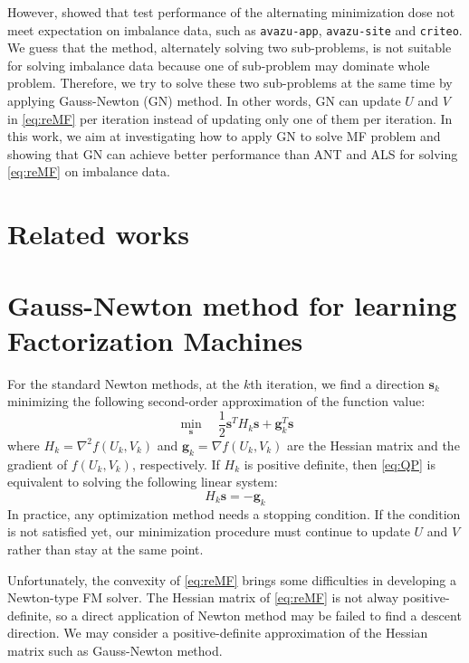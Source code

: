 \documentclass[11pt,twoside]{article}
\newcommand{\bsym}[1]{\ensuremath{\boldsymbol{#1}}}
\newcommand{\bs}{\ensuremath{\bsym{s}}}
\newcommand{\bg}{\ensuremath{\bsym{g}}}
\begin{document}
However, \citet{WSC18a} showed that test performance of the alternating minimization dose not meet expectation on imbalance data, such as {\tt avazu-app}, {\tt avazu-site} and {\tt criteo}. We guess that the method, alternately solving two sub-problems, is not suitable for solving imbalance data because one of sub-problem may dominate whole problem. Therefore, we try to solve these two sub-problems at the same time by applying Gauss-Newton (GN) method. In other words, GN can update $U$ and $V$ in \eqref{eq:reMF} per iteration instead of updating only one of them per iteration. In this work,
we aim at investigating how to apply GN to solve MF problem and showing that GN can achieve better performance than ANT and ALS for solving \eqref{eq:reMF} on imbalance data.

\section{Related works}
\section{Gauss-Newton method for learning Factorization Machines}
For the standard Newton methods, at the $k$th iteration, we find a direction $\bs_k$ minimizing the following second-order approximation of the function value:
\begin{equation}
    \min_{\bs} \quad \frac{1}{2}\bs^T H_k \bs + \bg_k^T \bs
\label{eq:QP}
\end{equation}
where $H_k = \nabla^2 f(U_k, V_k)$ and $\bg_k = \nabla f(U_k, V_k)$ are the Hessian matrix and the gradient of $f(U_k, V_k)$, respectively.
If $H_k$ is positive definite, then \eqref{eq:QP} is equivalent to solving the following linear system:
\begin{equation}
    H_k\bs = -\bg_k
\label{eq:HLE}
\end{equation}
In practice, any optimization method needs a stopping condition.
If the condition is not satisfied yet, our minimization procedure must continue to update $U$ and $V$ rather than stay at the same point.


Unfortunately, the convexity of \eqref{eq:reMF} brings some difficulties in developing a Newton-type FM solver.
The Hessian matrix of \eqref{eq:reMF}  is not alway positive-definite, so a direct application of Newton method may be failed to find a descent direction.
We may consider a positive-definite approximation of the Hessian matrix such as Gauss-Newton method. 
\end{document}
